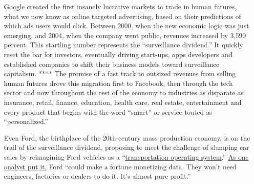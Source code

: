 Google created the first insanely lucrative markets to trade in human
futures, what we now know as online targeted advertising, based on their
predictions of which ads users would click. Between 2000, when the new
economic logic was just emerging, and 2004, when the company went
public, revenues increased by 3,590 percent. This startling number
represents the ``surveillance dividend.'' It quickly reset the bar for
investors, eventually driving start-ups, apps developers and established
companies to shift their business models toward surveillance capitalism.
**** The promise of a fast track to outsized revenues from selling human
futures drove this migration first to Facebook, then through the tech
sector and now throughout the rest of the economy to industries as
disparate as insurance, retail, finance, education, health care, real
estate, entertainment and every product that begins with the word
``smart'' or service touted as ``personalized.''

Even Ford, the birthplace of the 20th-century mass production economy,
is on the trail of the surveillance dividend, proposing to meet the
challenge of slumping car sales by reimagining Ford vehicles as a
``\href{http://freakonomics.com/podcast/ford/}{transportation operating
system}.''
\href{https://eu.freep.com/story/money/cars/2018/11/13/ford-motor-credit-data-new-revenue/1967077002/}{As
one analyst put it,} Ford ``could make a fortune monetizing data. They
won't need engineers, factories or dealers to do it. It's almost pure
profit.''

